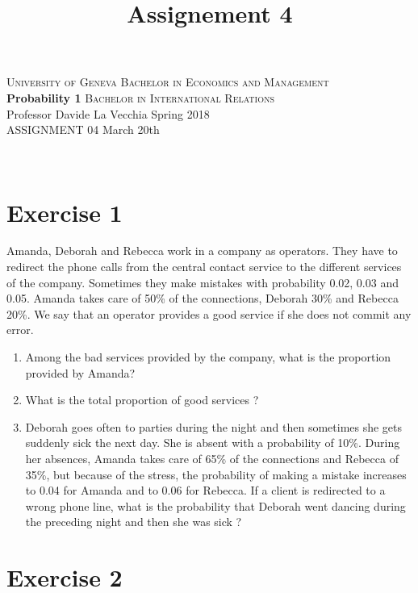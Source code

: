 \documentclass[12pt,thmsa]{article}
\title{Assignement 4}
\begin{document}
\noindent \textsc{University of Geneva}     \hfill \textsc{Bachelor in Economics and Management} \\
\textbf{Probability 1}                      \hfill \textsc{Bachelor in International Relations} \\
Professor Davide La Vecchia                 \hfill Spring 2018  \\
ASSIGNMENT 04                               \hfill   March 20th



\noindent
\makebox[\linewidth]{\rule{\textwidth}{0.4pt}}\\[1.5ex]

\section*{Exercise 1}

Amanda, Deborah and Rebecca work in a company as operators. They have to redirect the phone calls from the central contact service to the different services of the company. Sometimes they make mistakes with
probability 0.02, 0.03 and 0.05. Amanda takes care of 50\% of the connections, Deborah 30\% and Rebecca 20\%. We say that an operator provides a good service if she does not commit any error.

\begin{enumerate}
  \item Among the bad services provided by the company, what is the proportion provided by Amanda?
  \item What is the total proportion of good services ?
  \item  Deborah goes often to parties during the night and then sometimes she gets suddenly sick the next day. She is absent with a probability of 10\%.
  During her absences, Amanda takes care of 65\% of the connections and Rebecca of 35\%, but because of the stress, the probability of making a mistake
  increases to 0.04 for Amanda and to 0.06 for Rebecca. If a client is redirected to a wrong phone line, what is the probability that Deborah went dancing during the preceding night and then she was sick ?
\end{enumerate}







\section*{Exercise 2}
\end{document}
